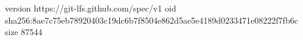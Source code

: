 version https://git-lfs.github.com/spec/v1
oid sha256:8ae7c75eb78920403c19dc6b7f8504e862d5ae5e4189d0233471e08222f7fb6c
size 87544
